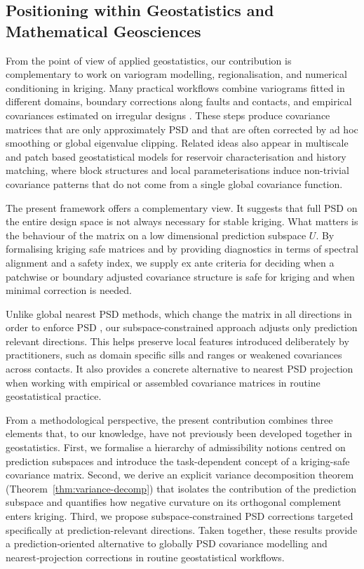 \documentclass[smallextended]{svjour3}
\newcommand{\1}{\mathbf{1}}
\begin{document}
\subsection{Positioning within Geostatistics and Mathematical Geosciences}

From the point of view of applied geostatistics, our contribution is complementary to work on variogram modelling, regionalisation, and numerical conditioning in kriging. Many practical workflows combine variograms fitted in different domains, boundary corrections along faults and contacts, and empirical covariances estimated on irregular designs \citep[e.g.][]{chilesdelfiner2012,isaaks1989,goovaerts1997}. These steps produce covariance matrices that are only approximately PSD and that are often corrected by ad hoc smoothing or global eigenvalue clipping. Related ideas also appear in multiscale and patch based geostatistical models for reservoir characterisation and history matching, where block structures and local parameterisations induce non-trivial covariance patterns that do not come from a single global covariance function.

The present framework offers a complementary view. It suggests that full PSD on the entire design space is not always necessary for stable kriging. What matters is the behaviour of the matrix on a low dimensional prediction subspace $U$. By formalising kriging safe matrices and by providing diagnostics in terms of spectral alignment and a safety index, we supply ex ante criteria for deciding when a patchwise or boundary adjusted covariance structure is safe for kriging and when minimal correction is needed.

Unlike global nearest PSD methods, which change the matrix in all directions in order to enforce PSD \citep{Higham1988,ChengHigham1998,Higham2002}, our subspace-constrained approach adjusts only prediction relevant directions. This helps preserve local features introduced deliberately by practitioners, such as domain specific sills and ranges or weakened covariances across contacts. It also provides a concrete alternative to nearest PSD projection when working with empirical or assembled covariance matrices in routine geostatistical practice.

From a methodological perspective, the present contribution combines three elements that, to our knowledge, have not previously been developed together in geostatistics. First, we formalise a hierarchy of admissibility notions centred on prediction subspaces and introduce the task-dependent concept of a kriging-safe covariance matrix. Second, we derive an explicit variance decomposition theorem (Theorem~\ref{thm:variance-decomp}) that isolates the contribution of the prediction subspace and quantifies how negative curvature on its orthogonal complement enters kriging. Third, we propose subspace‑constrained PSD corrections targeted specifically at prediction-relevant directions. Taken together, these results provide a prediction‑oriented alternative to globally PSD covariance modelling and nearest‑projection corrections in routine geostatistical workflows.
\end{document}
